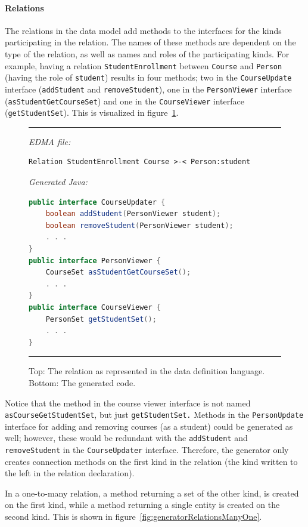 \paragraph{Relations}

The relations in the data model add methods to the interfaces for
the kinds participating in the relation. The names of these methods
are dependent on the type of the relation, as well as names and roles
of the participating kinds. For example, having a relation \texttt{StudentEnrollment}
between \texttt{Course} and \texttt{Person} (having the role of \texttt{student})
results in four methods; two in the \texttt{CourseUpdate} interface
(\texttt{addStudent} and \texttt{removeStudent}), one in the \texttt{PersonViewer}
interface (\texttt{asStudentGetCourseSet}) and one in the \texttt{CourseViewer}
interface (\texttt{getStudentSet}). This is visualized in figure~\ref{fig:generatorRelations}.

\begin{figure}[h]
\rule{\textwidth}{.1mm}
\emph{EDMA file:}
\begin{lstlisting}[language=edma,frame=l]
Relation StudentEnrollment Course >-< Person:student
\end{lstlisting}
\emph{Generated Java:}
\begin{lstlisting}[language=java,frame=l]
public interface CourseUpdater {
	boolean addStudent(PersonViewer student);
	boolean removeStudent(PersonViewer student);
	. . .
}
public interface PersonViewer {
	CourseSet asStudentGetCourseSet();
	. . .
}
public interface CourseViewer {
	PersonSet getStudentSet();
	. . .
}
\end{lstlisting}
\rule{\textwidth}{.1mm}
\caption{Top: The relation as represented in the data definition language. Bottom: The generated code.}
\label{fig:generatorRelations}
\end{figure}Notice that the method in the course viewer interface is not named
\texttt{asCourseGetStudentSet}, but just \texttt{getStudentSet.} Methods
in the \texttt{PersonUpdate} interface for adding and removing courses
(as a student) could be generated as well; however, these would be
redundant with the \texttt{addStudent} and \texttt{removeStudent}
in the \texttt{CourseUpdater} interface. Therefore, the generator
only creates connection methods on the first kind in the relation
(the kind written to the left in the relation declaration).

In a one-to-many relation, a method returning a set of the other kind,
is created on the first kind, while a method returning a single entity
is created on the second kind. This is shown in figure~\ref{fig:generatorRelationsManyOne}.

